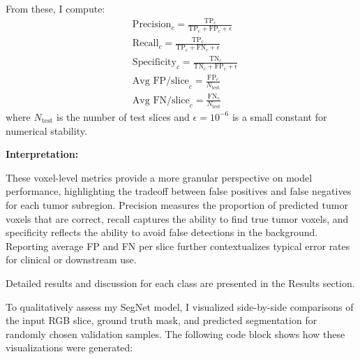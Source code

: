 From these, I compute:
\begin{align*}
    &\text{Precision}_c = \frac{\text{TP}_c}{\text{TP}_c + \text{FP}_c + \epsilon} \\
    &\text{Recall}_c = \frac{\text{TP}_c}{\text{TP}_c + \text{FN}_c + \epsilon} \\
    &\text{Specificity}_c = \frac{\text{TN}_c}{\text{TN}_c + \text{FP}_c + \epsilon} \\
    &\text{Avg FP/slice}_c = \frac{\text{FP}_c}{N_\text{test}} \\
    &\text{Avg FN/slice}_c = \frac{\text{FN}_c}{N_\text{test}}
\end{align*}
where $N_\text{test}$ is the number of test slices and $\epsilon = 10^{-6}$ is a small constant for numerical stability.

\vspace{0.5em}

\noindent
\textbf{Interpretation:}

These voxel-level metrics provide a more granular perspective on model performance, highlighting the tradeoff between false positives and false negatives for each tumor subregion. Precision measures the proportion of predicted tumor voxels that are correct, recall captures the ability to find true tumor voxels, and specificity reflects the ability to avoid false detections in the background. Reporting average FP and FN per slice further contextualizes typical error rates for clinical or downstream use.

Detailed results and discussion for each class are presented in the Results section.


\label{sec:qualitative-visualization-code}

To qualitatively assess my SegNet model, I visualized side-by-side comparisons of the input RGB slice, ground truth mask, and predicted segmentation for randomly chosen validation samples. The following code block shows how these visualizations were generated:

